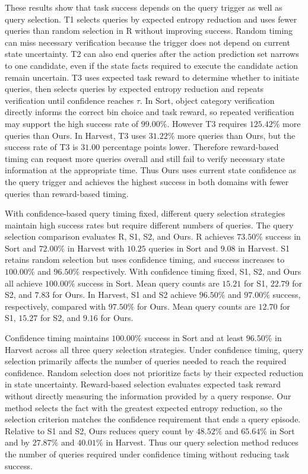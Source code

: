 These results show that task success depends on the query trigger as well as query selection. T1 selects queries by expected entropy reduction and uses fewer queries than random selection in R without improving success. Random timing can miss necessary verification because the trigger does not depend on current state uncertainty. T2 can also end queries after the action prediction set narrows to one candidate, even if the state facts required to execute the candidate action remain uncertain. T3 uses expected task reward to determine whether to initiate queries, then selects queries by expected entropy reduction and repeats verification until confidence reaches $\tau$. In Sort, object category verification directly informs the correct bin choice and task reward, so repeated verification may support the high success rate of $99.00\%$. However T3 requires $125.42\%$ more queries than Ours. In Harvest, T3 uses $31.22\%$ more queries than Ours, but the success rate of T3 is $31.00$ percentage points lower. Therefore reward-based timing can request more queries overall and still fail to verify necessary state information at the appropriate time. Thus Ours uses current state confidence as the query trigger and achieves the highest success in both domains with fewer queries than reward-based timing.

With confidence-based query timing fixed, different query selection strategies maintain high success rates but require different numbers of queries. The query selection comparison evaluates R, S1, S2, and Ours. R achieves $73.50\%$ success in Sort and $72.00\%$ in Harvest with $10.25$ queries in Sort and $9.08$ in Harvest. S1 retains random selection but uses confidence timing, and success increases to $100.00\%$ and $96.50\%$ respectively. With confidence timing fixed, S1, S2, and Ours all achieve $100.00\%$ success in Sort. Mean query counts are $15.21$ for S1, $22.79$ for S2, and $7.83$ for Ours. In Harvest, S1 and S2 achieve $96.50\%$ and $97.00\%$ success, respectively, compared with $97.50\%$ for Ours. Mean query counts are $12.70$ for S1, $15.27$ for S2, and $9.16$ for Ours.

Confidence timing maintains $100.00\%$ success in Sort and at least $96.50\%$ in Harvest across all three query selection strategies. Under confidence timing, query selection primarily affects the number of queries needed to reach the required confidence. Random selection does not prioritize facts by their expected reduction in state uncertainty. Reward-based selection evaluates expected task reward without directly measuring the information provided by a query response. Our method selects the fact with the greatest expected entropy reduction, so the selection criterion matches the confidence requirement that ends a query episode. Relative to S1 and S2, Ours reduces query count by $48.52\%$ and $65.64\%$ in Sort and by $27.87\%$ and $40.01\%$ in Harvest. Thus our query selection method reduces the number of queries required under confidence timing without reducing task success.

